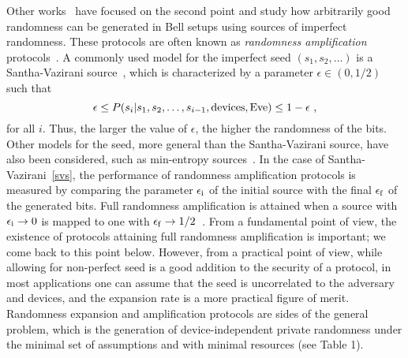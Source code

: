 \documentclass[11pt,a4paper]{article}
\begin{document}
Other works~\cite{coudron_yuen, Chung, crnatphys, rodrigo, BRGHHHSW 15, Bouda, RBHHHW 15, WBGHHHPR 16} have focused on the second point and study how arbitrarily good randomness can be generated in Bell setups using sources of imperfect randomness. These protocols are often known as  {\em randomness amplification} protocols~\cite{crnatphys}. A commonly used model for the imperfect seed $(s_1, s_2, \ldots)$ is a Santha-Vazirani source~\cite{svsource}, which is characterized by a parameter $\epsilon \in (0,1/2)$ such that
    \begin{equation}
      \label{svs}
      \epsilon \leq
      P(s_i|s_1, s_2, \ldots, s_{i-1}, {\rm devices}, {\rm Eve})
      \leq 1- \epsilon\ ,
    \end{equation}
for all $i$.
Thus, the larger the value of $\epsilon$, the higher the randomness of the bits. Other models for the seed, more general than the Santha-Vazirani source, have also been considered, such as min-entropy sources~\cite{Chung, Bouda}. In the case of Santha-Vazirani~\eqref{svs}, the performance of randomness amplification protocols is measured by comparing the parameter $\epsilon_{\rm i}$ of the initial source with the final $\epsilon_{\rm f}$ of the generated bits. Full randomness amplification is attained when a source with $\epsilon_{\rm i}\to 0$ is mapped to one with $\epsilon_{\rm f}\to 1/2$~\cite{rodrigo}.   From a fundamental point of view, the existence of protocols attaining full randomness amplification is important; we come back to this point below.
However, from a practical point of view, while allowing for non-perfect seed is a good addition to the security of a protocol, in most applications one can assume that the seed is uncorrelated to the adversary and devices, and the expansion rate is a more practical figure of merit. Randomness expansion and amplification protocols are sides of the general problem, which is the generation of device-independent private randomness under the minimal set of assumptions and with minimal resources (see Table 1).%
\end{document}
